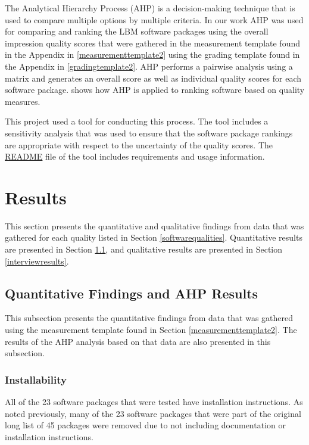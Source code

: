 \documentclass[12pt, notitlepage]{article}
\begin{document}
The Analytical Hierarchy Process (AHP) is a decision-making technique that is used to compare multiple options by multiple criteria. In our work AHP was used for comparing and ranking the LBM software packages using the overall impression quality scores that were gathered in the measurement template found in the Appendix in \ref{measurementtemplate2} using the grading template found in the Appendix in \ref{gradingtemplate2}. AHP performs a pairwise analysis using a matrix and generates an overall score as well as individual quality scores for each software package. \cite{SmithEtAl2016} shows how AHP is applied to ranking software based on quality measures. 

This project used a tool for conducting this process. The tool includes a sensitivity analysis that was used to ensure that the software package rankings are appropriate with respect to the uncertainty of the quality scores. The \href{https://github.com/smiths/AIMSS/blob/master/StateOfPractice/AHP2020/LBM/README.txt}{README} file of the tool includes requirements and usage information.

\newpage
\section{Results}\label{qualityresults}

This section presents the quantitative and qualitative findings from data that was gathered for each quality listed in Section \ref{softwarequalities}. Quantitative results are presented in Section \ref{AHPresults}, and qualitative results are presented in Section \ref{interviewresults}.

\subsection{Quantitative Findings and AHP Results}\label{AHPresults}

This subsection presents the quantitative findings from data that was gathered using the measurement template found in Section \ref{measurementtemplate2}. The results of the AHP analysis based on that data are also presented in this subsection.

\subsubsection{Installability}

All of the 23 software packages that were tested have installation instructions. As noted previously, many of the 23 software packages that were part of the original long list of 45 packages were removed due to not including documentation or installation instructions. 
\end{document}
